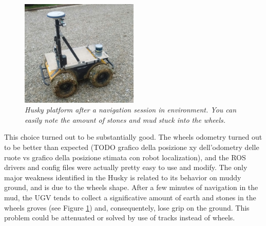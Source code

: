 \begin{figure}
	\centering
	\includegraphics[width=0.5\textwidth]{Images/grape_sw_hw_architecture/ruoteFangose.jpeg}
	\caption{\textit{Husky platform after a navigation session in environment. You can easily note the amount of stones and mud stuck into the wheels.}}
	\label{fig:ruoteFangose}
\end{figure}

This choice turned out to be substantially good. The wheels odometry turned out to be  better than expected (TODO grafico della posizione xy dell'odometry delle ruote vs grafico della posizione stimata con robot localization), and the \ac{ROS} drivers and config files were actually pretty easy to use and modify. The only major weakness identified in the Husky is related to its behavior on muddy ground, and is due to the wheels shape. After a few minutes of navigation in the mud, the \ac{UGV} tends to collect a significative amount of earth and stones in the wheels groves (see Figure \ref{fig:ruoteFangose}) and, consequentely, lose grip on the ground. This problem could be attenuated or solved by use of tracks instead of wheels.


